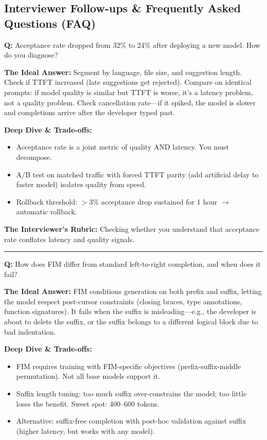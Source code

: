 \subsection*{Interviewer Follow-ups \& Frequently Asked Questions (FAQ)}

\textbf{Q:} Acceptance rate dropped from 32\% to 24\% after deploying a new model. How do you diagnose?

\textbf{The Ideal Answer:} Segment by language, file size, and suggestion length. Check if TTFT increased (late suggestions get rejected). Compare on identical prompts: if model quality is similar but TTFT is worse, it's a latency problem, not a quality problem. Check cancellation rate---if it spiked, the model is slower and completions arrive after the developer typed past.

\textbf{Deep Dive \& Trade-offs:}
\begin{itemize}
  \item Acceptance rate is a joint metric of quality AND latency. You must decompose.
  \item A/B test on matched traffic with forced TTFT parity (add artificial delay to faster model) isolates quality from speed.
  \item Rollback threshold: $>$3\% acceptance drop sustained for 1 hour $\rightarrow$ automatic rollback.
\end{itemize}

\textbf{The Interviewer's Rubric:} Checking whether you understand that acceptance rate conflates latency and quality signals.

\bigskip\hrule\bigskip

\textbf{Q:} How does FIM differ from standard left-to-right completion, and when does it fail?

\textbf{The Ideal Answer:} FIM conditions generation on both prefix and suffix, letting the model respect post-cursor constraints (closing braces, type annotations, function signatures). It fails when the suffix is misleading---e.g., the developer is about to delete the suffix, or the suffix belongs to a different logical block due to bad indentation.

\textbf{Deep Dive \& Trade-offs:}
\begin{itemize}
  \item FIM requires training with FIM-specific objectives (prefix-suffix-middle permutation). Not all base models support it.
  \item Suffix length tuning: too much suffix over-constrains the model; too little loses the benefit. Sweet spot: 400--600 tokens.
  \item Alternative: suffix-free completion with post-hoc validation against suffix (higher latency, but works with any model).
\end{itemize}

